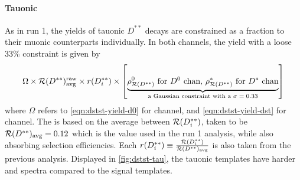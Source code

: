 \paragraph{Tauonic}
As in run 1, the yields of  tauonic $D^{**}$ decays are constrained as a
fraction to their muonic counterparts individually.
In both channels, the yield with a loose 33\% constraint is given by
\begin{equation}
    \Omega \times \fitRDststRaw \times \fitRDiRatio \times \left[
        \underbrace{\text{\fitRDDstst for \Dz chan, \fitRDstst for \Dstar chan}}_\text{
            a Gaussian constraint with a $\sigma = 0.33$
        }
    \right]
\end{equation}
where $\Omega$ refers to \cref{eqn:dstst-yield-d0} for \Dz channel,
and \cref{eqn:dstst-yield-dst} for \Dstar channel.
The \fitRDststRaw is based on the average between $\mathcal{R}(D^{**}_i)$,
taken to be $\mathcal{R}(D^{**})_\text{avg} = 0.12$ which is the value used in
the run 1 analysis,
while also absorbing selection efficiencies.
Each
$r(D^{**}_i) \equiv \frac{\mathcal{R}(D^{**}_i)}{\mathcal{R}(D^{**})_\text{avg}}$
is also taken from the previous analysis.
Displayed in \ref{fig:dstst-tau},
the tauonic \Dstst templates have harder \mmSq and \qSq spectra compared to the
signal templates.

